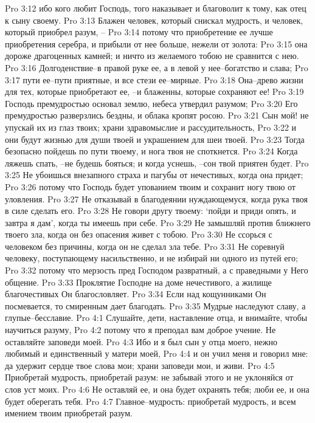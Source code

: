 Pro 3:12  ибо кого любит Господь, того наказывает и благоволит к тому, как отец к сыну своему.
Pro 3:13  Блажен человек, который снискал мудрость, и человек, который приобрел разум, --
Pro 3:14  потому что приобретение ее лучше приобретения серебра, и прибыли от нее больше, нежели от золота:
Pro 3:15  она дороже драгоценных камней; и ничто из желаемого тобою не сравнится с нею.
Pro 3:16  Долгоденствие--в правой руке ее, а в левой у нее--богатство и слава;
Pro 3:17  пути ее--пути приятные, и все стези ее--мирные.
Pro 3:18  Она--древо жизни для тех, которые приобретают ее, --и блаженны, которые сохраняют ее!
Pro 3:19  Господь премудростью основал землю, небеса утвердил разумом;
Pro 3:20  Его премудростью разверзлись бездны, и облака кропят росою.
Pro 3:21  Сын мой! не упускай их из глаз твоих; храни здравомыслие и рассудительность,
Pro 3:22  и они будут жизнью для души твоей и украшением для шеи твоей.
Pro 3:23  Тогда безопасно пойдешь по пути твоему, и нога твоя не споткнется.
Pro 3:24  Когда ляжешь спать, --не будешь бояться; и когда уснешь, --сон твой приятен будет.
Pro 3:25  Не убоишься внезапного страха и пагубы от нечестивых, когда она придет;
Pro 3:26  потому что Господь будет упованием твоим и сохранит ногу твою от уловления.
Pro 3:27  Не отказывай в благодеянии нуждающемуся, когда рука твоя в силе сделать его.
Pro 3:28  Не говори другу твоему: `пойди и приди опять, и завтра я дам', когда ты имеешь при себе.
Pro 3:29  Не замышляй против ближнего твоего зла, когда он без опасения живет с тобою.
Pro 3:30  Не ссорься с человеком без причины, когда он не сделал зла тебе.
Pro 3:31  Не соревнуй человеку, поступающему насильственно, и не избирай ни одного из путей его;
Pro 3:32  потому что мерзость пред Господом развратный, а с праведными у Него общение.
Pro 3:33  Проклятие Господне на доме нечестивого, а жилище благочестивых Он благословляет.
Pro 3:34  Если над кощунниками Он посмевается, то смиренным дает благодать.
Pro 3:35  Мудрые наследуют славу, а глупые--бесславие.
Pro 4:1  Слушайте, дети, наставление отца, и внимайте, чтобы научиться разуму,
Pro 4:2  потому что я преподал вам доброе учение. Не оставляйте заповеди моей.
Pro 4:3  Ибо и я был сын у отца моего, нежно любимый и единственный у матери моей,
Pro 4:4  и он учил меня и говорил мне: да удержит сердце твое слова мои; храни заповеди мои, и живи.
Pro 4:5  Приобретай мудрость, приобретай разум: не забывай этого и не уклоняйся от слов уст моих.
Pro 4:6  Не оставляй ее, и она будет охранять тебя; люби ее, и она будет оберегать тебя.
Pro 4:7  Главное--мудрость: приобретай мудрость, и всем имением твоим приобретай разум.
